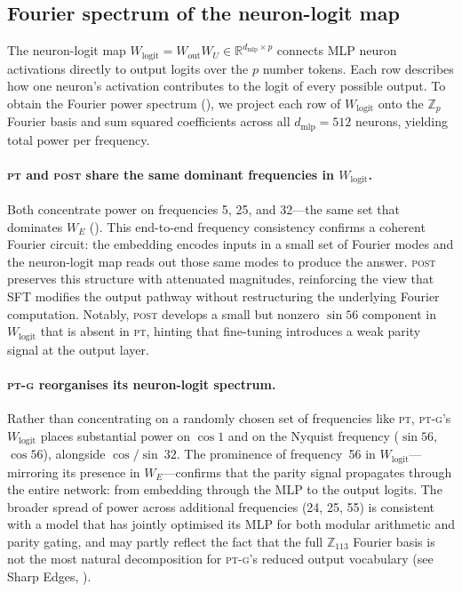 \documentclass[10pt, letterpaper]{article}
\newcommand{\PT}{\textsc{pt}}
\newcommand{\POST}{\textsc{post}}
\newcommand{\PTG}{\textsc{pt-g}}
\newcommand{\Wlogit}{W_{\text{logit}}}
\newcommand{\WU}{W_U}
\newcommand{\Wout}{W_{\text{out}}}
\begin{document}
\subsection{Fourier spectrum of the neuron-logit map}
\label{sec:analysis:neuron_logit}

The neuron-logit map $\Wlogit = \Wout \WU \in \mathbb{R}^{d_{\text{mlp}} \times p}$ connects MLP neuron activations directly to output logits over the $p$ number tokens.
Each row describes how one neuron's activation contributes to the logit of every possible output.
To obtain the Fourier power spectrum (), we project each row of $\Wlogit$ onto the $\mathbb{Z}_p$ Fourier basis and sum squared coefficients across all $d_{\text{mlp}} = 512$ neurons, yielding total power per frequency.

\paragraph{\PT{} and \POST{} share the same dominant frequencies in $\Wlogit$.}
Both concentrate power on frequencies 5, 25, and 32---the same set that dominates $W_E$ ().
This end-to-end frequency consistency confirms a coherent Fourier circuit: the embedding encodes inputs in a small set of Fourier modes and the neuron-logit map reads out those same modes to produce the answer.
\POST{} preserves this structure with attenuated magnitudes, reinforcing the view that SFT modifies the output pathway without restructuring the underlying Fourier computation.
Notably, \POST{} develops a small but nonzero $\sin 56$ component in $\Wlogit$ that is absent in \PT{}, hinting that fine-tuning introduces a weak parity signal at the output layer.

\paragraph{\PTG{} reorganises its neuron-logit spectrum.}
Rather than concentrating on a randomly chosen set of frequencies like \PT{}, \PTG{}'s $\Wlogit$ places substantial power on $\cos 1$ and on the Nyquist frequency ($\sin 56$, $\cos 56$), alongside $\cos/\sin\ 32$.
The prominence of frequency~56 in $\Wlogit$---mirroring its presence in $W_E$---confirms that the parity signal propagates through the entire network: from embedding through the MLP to the output logits.
The broader spread of power across additional frequencies (24, 25, 55) is consistent with a model that has jointly optimised its MLP for both modular arithmetic and parity gating, and may partly reflect the fact that the full $\mathbb{Z}_{113}$ Fourier basis is not the most natural decomposition for \PTG{}'s reduced output vocabulary (see Sharp Edges, ).
\end{document}
